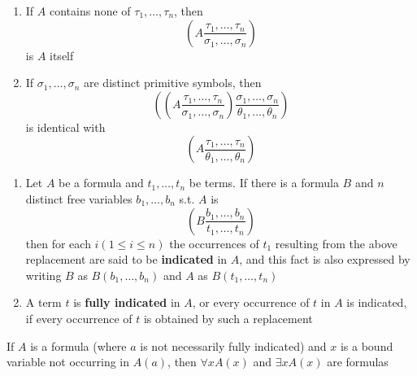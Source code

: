 \documentclass[11pt]{article}
\begin{document}
\begin{proposition}[]
\begin{enumerate}
\item If \(A\) contains none of \(\tau_1,\dots,\tau_n\), then
\begin{equation*}
\left(
A\frac{\tau_1,\dots,\tau_n}{\sigma_1,\dots,\sigma_n}
\right)
\end{equation*}
is \(A\) itself
\item If \(\sigma_1,\dots,\sigma_n\) are distinct primitive symbols, then
\begin{equation*}
\left(\left(
A\frac{\tau_1,\dots,\tau_n}{\sigma_1,\dots,\sigma_n}
\right)\frac{\sigma_1,\dots,\sigma_n}{\theta_1,\dots,\theta_n}\right)
\end{equation*}
is identical with
\begin{equation*}
\left(
A\frac{\tau_1,\dots,\tau_n}{\theta_1,\dots,\theta_n}
\right)
\end{equation*}
\end{enumerate}
\end{proposition}

\begin{definition}[]
\begin{enumerate}
\item Let \(A\) be a formula and \(t_1,\dots,t_n\) be terms. If there is a
formula \(B\) and \(n\) distinct free variables \(b_1,\dots,b_n\) s.t.
\(A\) is
\begin{equation*}
\left(
B\frac{b_1,\dots,b_n}{t_1,\dots,t_n}
\right)
\end{equation*}
then for each \(i(1\le i\le n)\) the occurrences of \(t_1\) resulting from
the above replacement are said to be \textbf{indicated} in \(A\), and this fact is
also expressed by writing \(B\) as \(B(b_1,\dots,b_n)\) and \(A\) as \(B(t_1,\dots,t_n)\)
\item A term \(t\) is \textbf{fully indicated} in \(A\), or every occurrence of \(t\) in
\(A\) is indicated, if every occurrence of \(t\) is obtained by such a replacement
\end{enumerate}
\end{definition}

\begin{proposition}[]
If \(A\) is a formula (where \(a\) is not necessarily fully indicated) and
\(x\) is a bound variable not occurring in \(A(a)\), then \(\forall xA(x)\) and
\(\exists xA(x)\) are formulas
\end{proposition}
\end{document}
